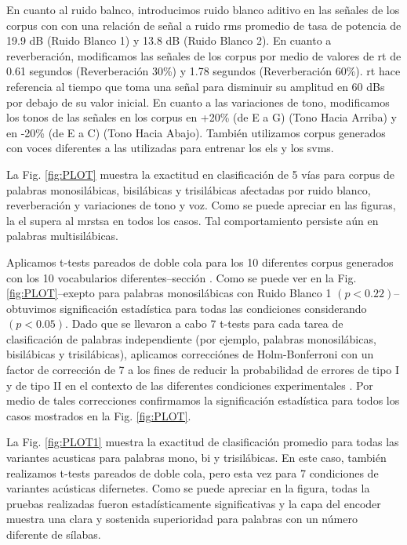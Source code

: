{En cuanto al ruido balnco, introducimos ruido blanco aditivo en las señales de los corpus con con una relación de señal a ruido \gls{rms} promedio de tasa de potencia de 19.9 dB (Ruido Blanco 1) y 13.8 dB (Ruido Blanco 2). En cuanto a reverberación, modificamos las señales de los corpus por medio de valores de \gls{rt} de 0.61 segundos (Reverberación 30\%) y 1.78 segundos (Reverberación 60\%). \gls{rt} hace referencia al tiempo que toma una señal para disminuir su amplitud en 60 dBs por debajo de su valor inicial. En cuanto a las variaciones de tono, modificamos los tonos de las señales en los corpus en +20\% (de E a G) (Tono Hacia Arriba) y en -20\% (de E a C) (Tono Hacia Abajo). También utilizamos corpus generados con voces diferentes a las utilizadas para entrenar los \glspl{el} y los \glspl{svm}.

La Fig. \ref{fig:PLOT} muestra la exactitud en clasificación de 5 vías para corpus de palabras monosilábicas, bisilábicas y trisilábicas afectadas por ruido blanco, reverberación y variaciones de tono y voz. Como se puede apreciar en las figuras, la \gls{el} supera al \gls{mrstsa} en todos los casos. Tal comportamiento persiste aún en palabras multisilábicas.

Aplicamos t-tests pareados de doble cola para los 10 diferentes corpus generados con los 10 vocabularios diferentes--sección . Como se puede ver en la Fig. \ref{fig:PLOT}--exepto para palabras monosilábicas con Ruido Blanco 1 $(p < 0.22)$--obtuvimos significación estadística para todas las condiciones considerando $(p<0.05)$. 
Dado que se llevaron a cabo 7 t-tests para cada tarea de clasificación de palabras independiente (por ejemplo, palabras monosilábicas, bisilábicas y trisilábicas), aplicamos correcciónes de Holm-Bonferroni con un factor de corrección de 7 a los fines de reducir la probabilidad de errores de tipo I y de tipo II en el contexto de las diferentes condiciones experimentales \cite{10.1093/biomet/75.2.383}. Por medio de tales correcciones confirmamos la significación estadística para todos los casos mostrados en la Fig. \ref{fig:PLOT}.

La Fig. \ref{fig:PLOT1} muestra la exactitud de clasificación promedio para todas las variantes acusticas para palabras mono, bi y trisilábicas.
En este caso, también realizamos t-tests pareados de doble cola, pero esta vez para 7 condiciones de variantes acústicas difernetes.
Como se puede apreciar en la figura, todas la pruebas realizadas fueron estadísticamente significativas  y la capa del encoder muestra una clara y sostenida superioridad para palabras con un número diferente de sílabas.

}
